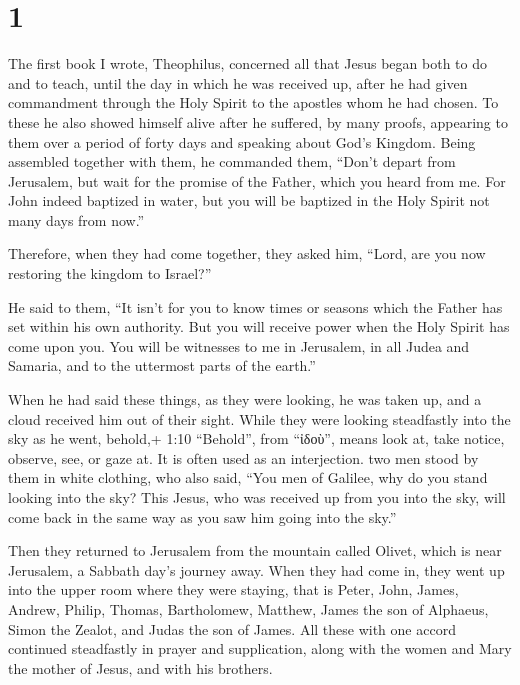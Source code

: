 \hypertarget{section}{%
\section{1}\label{section}}

 The first book I wrote, Theophilus, concerned all that
Jesus began both to do and to teach,  until the day in which
he was received up, after he had given commandment through the Holy
Spirit to the apostles whom he had chosen.  To these he also
showed himself alive after he suffered, by many proofs, appearing to
them over a period of forty days and speaking about God's Kingdom.
 Being assembled together with them, he commanded them,
``Don't depart from Jerusalem, but wait for the promise of the Father,
which you heard from me.  For John indeed baptized in water,
but you will be baptized in the Holy Spirit not many days from now.''

 Therefore, when they had come together, they asked him,
``Lord, are you now restoring the kingdom to Israel?''

 He said to them, ``It isn't for you to know times or
seasons which the Father has set within his own authority. 
But you will receive power when the Holy Spirit has come upon you. You
will be witnesses to me in Jerusalem, in all Judea and Samaria, and to
the uttermost parts of the earth.''

 When he had said these things, as they were looking, he was
taken up, and a cloud received him out of their sight. 
While they were looking steadfastly into the sky as he went, behold,+
1:10 ``Behold'', from ``ἰδοὺ'', means look at, take notice, observe,
see, or gaze at. It is often used as an interjection. two men stood by
them in white clothing,  who also said, ``You men of
Galilee, why do you stand looking into the sky? This Jesus, who was
received up from you into the sky, will come back in the same way as you
saw him going into the sky.''

 Then they returned to Jerusalem from the mountain called
Olivet, which is near Jerusalem, a Sabbath day's journey away.
 When they had come in, they went up into the upper room
where they were staying, that is Peter, John, James, Andrew, Philip,
Thomas, Bartholomew, Matthew, James the son of Alphaeus, Simon the
Zealot, and Judas the son of James.  All these with one
accord continued steadfastly in prayer and supplication, along with the
women and Mary the mother of Jesus, and with his brothers.

